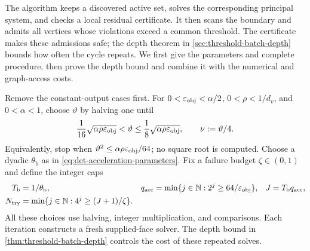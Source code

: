 The algorithm keeps a discovered active set, solves the corresponding
principal system, and checks a local residual certificate. It then scans
the boundary and admits all vertices whose violations exceed a common
threshold. The certificate makes these admissions safe; the depth theorem
in \cref{sec:threshold-batch-depth} bounds how often the cycle repeats.
We first give the parameters and complete procedure, then prove the depth
bound and combine it with the numerical and graph-access costs.

Remove the constant-output cases first. For
$0<\varepsilon_{\mathrm{obj}}<\alpha/2$, $0<\rho<1/d_v$, and $0<\alpha<1$, choose
$\vartheta$ by halving one until
\begin{equation}
 \frac1{16}\sqrt{\alpha\rho\varepsilon_{\mathrm{obj}}}<\vartheta
       \leq\frac18\sqrt{\alpha\rho\varepsilon_{\mathrm{obj}}},\qquad
 \nu:=\vartheta/4.
 \label{eq:algorithm-threshold}
\end{equation}
Equivalently, stop when $\vartheta^2\leq\alpha\rho\varepsilon_{\mathrm{obj}}/64$;
no square root is computed. Choose a dyadic $\theta_{\mathrm{b}}$ as in
\cref{eq:det-acceleration-parameters}. Fix a failure budget
$\zeta\in(0,1)$ and define the integer caps
\begin{equation}
 \begin{aligned}
 T_{\mathrm{b}}&=1/\theta_{\mathrm{b}},&
 q_{\mathrm{acc}}&=\min\{j\in\mathbb{N}:2^j\geq64/\varepsilon_{\mathrm{obj}}\},&
 J&=T_{\mathrm{b}}q_{\mathrm{acc}},\\
 N_{\mathrm{try}}&=\min\{j\in\mathbb{N}:4^j\geq(J+1)/\zeta\}.&&&
 \end{aligned}
 \label{eq:algorithm-parameters}
\end{equation}
All these choices use halving, integer multiplication, and comparisons.
Each iteration constructs a fresh supplied-face solver. The depth bound
in \cref{thm:threshold-batch-depth} controls the cost of these repeated
solves.

